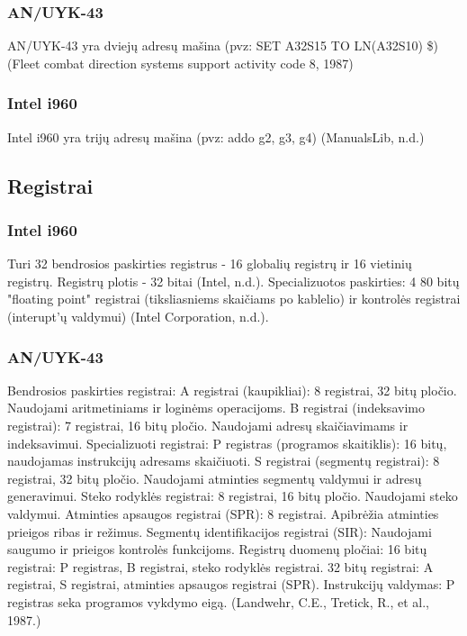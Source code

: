 \documentclass{article}
\begin{document}
\subsubsection{AN/UYK-43}
AN/UYK-43 yra dviejų adresų mašina (pvz: SET A32S15 TO LN(A32S10) \$) (Fleet combat direction systems support activity code 8, 1987)
\subsubsection{Intel i960}
Intel i960 yra trijų adresų mašina (pvz: addo g2, g3, g4) (ManualsLib, n.d.)
\subsection{Registrai}
\subsubsection{Intel i960}
Turi 32 bendrosios paskirties registrus - 16 globalių registrų ir 16 vietinių registrų. Registrų plotis - 32 bitai (Intel, n.d.). Specializuotos paskirties: 4 80 bitų "floating point" registrai (tiksliasniems skaičiams po kablelio) ir kontrolės registrai (interupt'ų valdymui) (Intel Corporation, n.d.).
\subsubsection{AN/UYK-43}
Bendrosios paskirties registrai: A registrai (kaupikliai): 8 registrai, 32 bitų pločio. Naudojami aritmetiniams ir loginėms operacijoms.
B registrai (indeksavimo registrai): 7 registrai, 16 bitų pločio. Naudojami adresų skaičiavimams ir indeksavimui. Specializuoti registrai: P registras (programos skaitiklis): 16 bitų, naudojamas instrukcijų adresams skaičiuoti. S registrai (segmentų registrai): 8 registrai, 32 bitų pločio. Naudojami atminties segmentų valdymui ir adresų generavimui.
Steko rodyklės registrai: 8 registrai, 16 bitų pločio. Naudojami steko valdymui. Atminties apsaugos registrai (SPR): 8 registrai. Apibrėžia atminties prieigos ribas ir režimus. Segmentų identifikacijos registrai (SIR): Naudojami saugumo ir prieigos kontrolės funkcijoms. Registrų duomenų pločiai: 16 bitų registrai: P registras, B registrai, steko rodyklės registrai. 32 bitų registrai: A registrai, S registrai, atminties apsaugos registrai (SPR). Instrukcijų valdymas: P registras seka programos vykdymo eigą. (Landwehr, C.E., Tretick, R., et al., 1987.)
\end{document}
